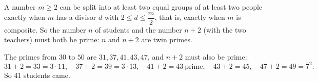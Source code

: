A number $m\ge2$ can be split into at least two equal groups of at least two people exactly when $m$ has a divisor $d$ with $2\le d\le\dfrac {m}{2}$, that is, exactly when $m$ is composite. So the number $n$ of students and the number $n+2$ (with the two teachers) must both be prime: $n$ and $n+2$ are twin primes.

The primes from $30$ to $50$ are $31,37,41,43,47$, and $n+2$ must also be prime:
\[
31+2=33=3\cdot11,\quad 37+2=39=3\cdot13,\quad 41+2=43\ \text{prime},\quad 43+2=45,\quad 47+2=49=7^2 .
\]
So $\boxed{41}$ students came.
